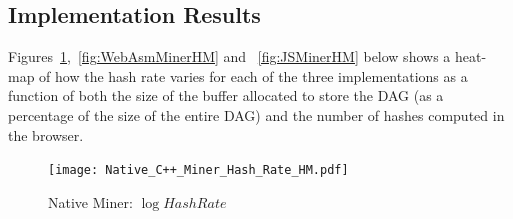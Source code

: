 \documentclass[runningheads]{llncs}
\newcommand{\trishita}[1]{{\color{magenta}\bfseries[Trishita: #1]}}
\begin{document}



\subsection{Implementation Results}
Figures~\ref{fig:NativeMinerHM},~\ref{fig:WebAsmMinerHM} and ~\ref{fig:JSMinerHM} below shows a heat-map of how the hash rate varies for each of the three implementations as a function of both the size of the buffer allocated to store the DAG (as a percentage of the size of the entire DAG) and the number of hashes computed in the browser. 

\begin{figure}[h]
\centering
\texttt{[image: Native\_C++\_Miner\_Hash\_Rate\_HM.pdf]}
\caption{\label{fig:NativeMinerHM} Native Miner: $\log{Hash Rate}$}
\end{figure}
\end{document}
